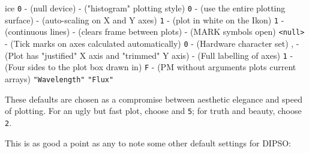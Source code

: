 \documentclass[twoside,11pt,noabs,nolof]{starlink}
\begin{document}
ice  {\texttt{0}}  - (null device) \newline
{}  - ("histogram" plotting style) \newline
{}  {\texttt{0}}  - (use the entire plotting surface) \newline
{}  - (auto-scaling on X and Y axes) \newline
{}  {\texttt{1}}  - (plot in white on the Ikon) \newline
{}  {\texttt{1}}  - (continuous lines) \newline
{}  - (clears frame between plots) \newline
{}  - (MARK symbols open) \newline
{}  {\texttt{<null>}}  - (Tick marks on axes calculated automatically) \newline
{}  {\texttt{0}}  - (Hardware character set) \newline
{},    - (Plot has "justified" X axis and "trimmed" Y axis) \newline
{}  - (Full labelling of axes) \newline
{}  {\texttt{1}}  - (Four sides to the plot box drawn in) \newline
{}  {\texttt{F}}  - (PM without arguments plots current arrays) \newline
{}  {\texttt{"Wavelength"}}  \newline
{}  {\texttt{"Flux"}}  \newline

These defaults are chosen as a compromise between aesthetic elegance and
speed of plotting. For an ugly but fast plot, choose  and \texttt{5}; for
truth and beauty, choose   {\texttt{2}}.

This is as good a point as any to note some other default settings for
DIPSO:
\end{document}
